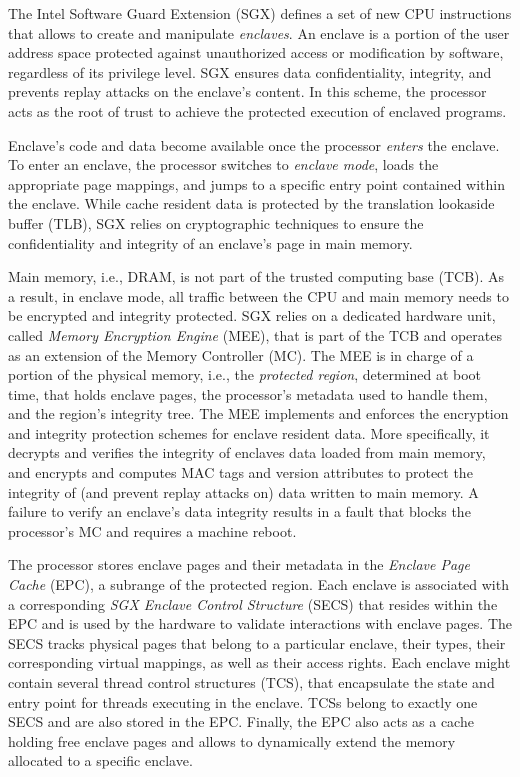 % 
The Intel Software Guard Extension (SGX) defines a set of new CPU instructions that allows to create and manipulate \emph{enclaves}.
An enclave is a portion of the user address space protected against unauthorized access or modification by software, regardless of its privilege level.
SGX ensures data confidentiality, integrity, and prevents replay attacks on the enclave's content.
In this scheme, the processor acts as the root of trust to achieve the protected execution of enclaved programs.

Enclave's code and data become available once the processor \emph{enters} the enclave.
To enter an enclave, the processor switches to \emph{enclave mode}, loads the appropriate page mappings, and jumps to a specific entry point contained within the enclave.
While cache resident data is protected by the translation lookaside buffer (TLB), SGX relies on cryptographic techniques to ensure the confidentiality and integrity of an enclave's page in main memory.

Main memory, i.e., DRAM, is not part of the trusted computing base (TCB).
As a result, in enclave mode, all traffic between the CPU and main memory needs to be encrypted and integrity protected.
SGX relies on a dedicated hardware unit, called \emph{Memory Encryption Engine} (MEE), that is part of the TCB and operates as an extension of the Memory Controller (MC).
The MEE is in charge of a portion of the physical memory, i.e., the \emph{protected region}, determined at boot time, that holds enclave pages, the processor's metadata used to handle them, and the region's integrity tree.
The MEE implements and enforces the encryption and integrity protection schemes for enclave resident data.
More specifically, it decrypts and verifies the integrity of enclaves data loaded from main memory, and encrypts and computes MAC tags and version attributes to protect the integrity of (and prevent replay attacks on) data written to main memory.
A failure to verify an enclave's data integrity results in a fault that blocks the processor's MC and requires a machine reboot.

The processor stores enclave pages and their metadata in the \emph{Enclave Page Cache} (EPC), a subrange of the protected region.
Each enclave is associated with a corresponding \emph{SGX Enclave Control Structure} (SECS) that resides within the EPC and is used by the hardware to validate interactions with enclave pages.
The SECS tracks physical pages that belong to a particular enclave, their types, their corresponding virtual mappings, as well as their access rights.
Each enclave might contain several thread control structures (TCS), that encapsulate the state and entry point for threads executing in the enclave.
TCSs belong to exactly one SECS and are also stored in the EPC.
Finally, the EPC also acts as a cache holding free enclave pages and allows to dynamically extend the memory allocated to a specific enclave.

